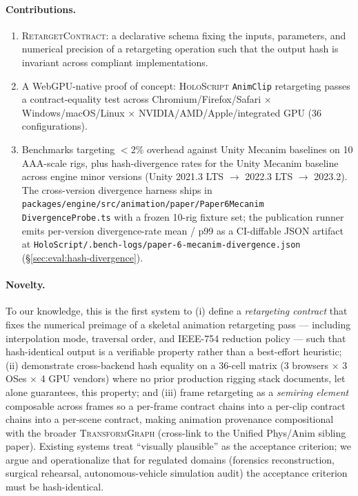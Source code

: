 \documentclass[sigconf,nonacm]{acmart}
\newcommand{\holoscript}{\textsc{HoloScript}}
\newcommand{\retargetcontract}{\textsc{RetargetContract}}
\newcommand{\transformgraph}{\textsc{TransformGraph}} %
\newcommand{\animclip}{\texttt{AnimClip}}
\begin{document}
\paragraph{Contributions.}
\begin{enumerate}
  \item \retargetcontract{}: a declarative schema fixing the inputs,
    parameters, and numerical precision of a retargeting operation
    such that the output hash is invariant across compliant
    implementations.
  \item A WebGPU-native proof of concept: \holoscript{} \animclip{}
    retargeting passes a contract-equality test across
    Chromium/Firefox/Safari $\times$ Windows/macOS/Linux $\times$
    NVIDIA/AMD/Apple/integrated GPU (36 configurations).
  \item Benchmarks targeting $<2\%$ overhead against Unity Mecanim
    baselines on 10 AAA-scale rigs, plus hash-divergence rates for
    the Unity Mecanim baseline across engine minor versions
    (Unity 2021.3 LTS $\to$ 2022.3 LTS $\to$ 2023.2). The
    cross-version divergence harness ships in
    \texttt{packages/engine/src/animation/paper/Paper6Mecanim%
    DivergenceProbe.ts} with a frozen 10-rig fixture set; the
    publication runner emits per-version divergence-rate mean / p99
    as a CI-diffable JSON artifact at
    \texttt{HoloScript/.bench-logs/paper-6-mecanim-divergence.json}
    (\S\ref{sec:eval:hash-divergence}).
\end{enumerate}

\paragraph{Novelty.}
To our knowledge, this is the first system to (i) define a
\emph{retargeting contract} that fixes the numerical preimage of a
skeletal animation retargeting pass --- including interpolation mode,
traversal order, and IEEE-754 reduction policy --- such that
hash-identical output is a verifiable property rather than a
best-effort heuristic; (ii) demonstrate cross-backend hash equality on
a $36$-cell matrix (3 browsers $\times$ 3 OSes $\times$ 4 GPU vendors)
where no prior production rigging stack documents, let alone
guarantees, this property; and (iii) frame retargeting as a
\emph{semiring element} composable across frames so a per-frame contract
chains into a per-clip contract chains into a per-scene contract,
making animation provenance compositional with the broader
\transformgraph{} (cross-link to the Unified Phys/Anim sibling paper).
Existing systems treat ``visually plausible'' as the acceptance
criterion; we argue and operationalize that for regulated domains
(forensics reconstruction, surgical rehearsal, autonomous-vehicle
simulation audit) the acceptance criterion must be hash-identical.
\end{document}
